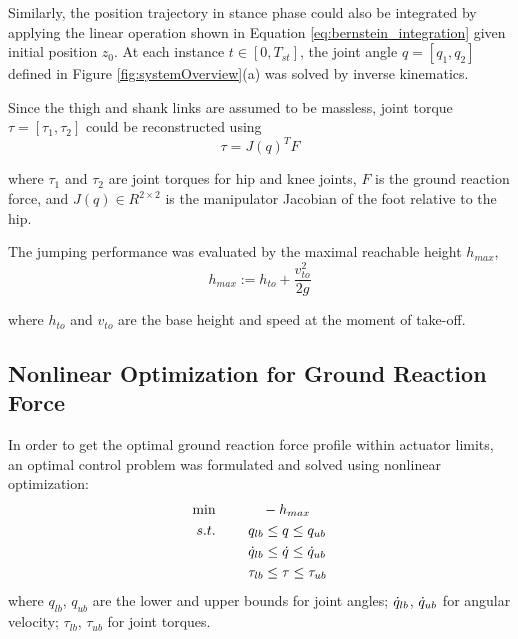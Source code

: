 Similarly, the position trajectory in stance phase could also be integrated by applying the linear operation shown in Equation \ref{eq:bernstein_integration} given initial position $z_0$. At each instance  $t\in[0,T_{st} ]$, the joint angle $q=[q_1,q_2]$ defined in Figure \ref{fig:systemOverview}(a) was solved by inverse kinematics. 

Since the thigh and shank links are assumed to be massless, joint torque $\tau=[\tau_1,\tau_2]$ could be reconstructed using 
\begin{equation}
	\tau=J(q)^T F
\end{equation}

where $\tau_1$ and $\tau_2$ are joint torques for hip and knee joints, $F$ is the ground reaction force, and $J(q)\in R^{2\times 2} $ is the manipulator Jacobian of the foot relative to the hip.

The jumping performance was evaluated by the maximal reachable height $h_{max}$,
 \begin{equation}
 	 h_{max} := h_{to}+\frac{v_{to}^2}{2g}
 \end{equation}

 where $h_{to}$ and $v_{to}$ are the base height and speed at the moment of take-off.

\subsection{Nonlinear Optimization for Ground Reaction Force}
\label{sec:nonlOptGRF}

In order to get the optimal ground reaction force profile within actuator limits, an optimal control problem was formulated and solved using nonlinear optimization:
\begin{equation}\label{eq:path_constraints}
\begin{aligned}
\min&~~~~~~~~~~-h_{max}\\
s.t.&~~~~~~~q_{lb}\leq q \leq q_{ub}\\
&~~~~~~~{\dot{q}}_{lb}\leq {\dot{q}} \leq {\dot{q}}_{ub}\\
&~~~~~~~\tau_{lb}\leq \tau \leq \tau_{ub}\\			 	
\end{aligned}
\end{equation}
where $q_{lb}$, $q_{ub}$ are the lower and upper bounds for joint angles; ${\dot{q}}_{lb}$, ${\dot{q}}_{ub}$ for angular velocity; $\tau_{lb}$, $\tau_{ub}$ for joint torques.  

